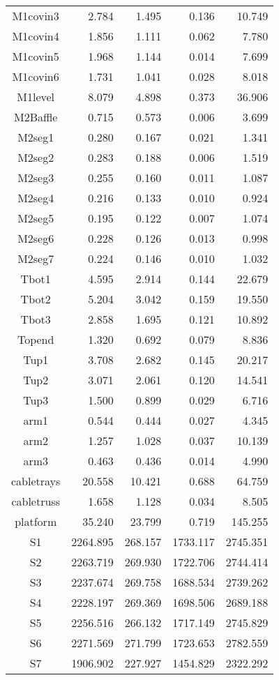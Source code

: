 \begin{longtable}{crrrr}
 M1covin3 & 2.784 & 1.495 & 0.136 & 10.749 \\
 M1covin4 & 1.856 & 1.111 & 0.062 & 7.780 \\
 M1covin5 & 1.968 & 1.144 & 0.014 & 7.699 \\
 M1covin6 & 1.731 & 1.041 & 0.028 & 8.018 \\
 M1level & 8.079 & 4.898 & 0.373 & 36.906 \\
 M2Baffle & 0.715 & 0.573 & 0.006 & 3.699 \\
 M2seg1 & 0.280 & 0.167 & 0.021 & 1.341 \\
 M2seg2 & 0.283 & 0.188 & 0.006 & 1.519 \\
 M2seg3 & 0.255 & 0.160 & 0.011 & 1.087 \\
 M2seg4 & 0.216 & 0.133 & 0.010 & 0.924 \\
 M2seg5 & 0.195 & 0.122 & 0.007 & 1.074 \\
 M2seg6 & 0.228 & 0.126 & 0.013 & 0.998 \\
 M2seg7 & 0.224 & 0.146 & 0.010 & 1.032 \\
 Tbot1 & 4.595 & 2.914 & 0.144 & 22.679 \\
 Tbot2 & 5.204 & 3.042 & 0.159 & 19.550 \\
 Tbot3 & 2.858 & 1.695 & 0.121 & 10.892 \\
 Topend & 1.320 & 0.692 & 0.079 & 8.836 \\
 Tup1 & 3.708 & 2.682 & 0.145 & 20.217 \\
 Tup2 & 3.071 & 2.061 & 0.120 & 14.541 \\
 Tup3 & 1.500 & 0.899 & 0.029 & 6.716 \\
 arm1 & 0.544 & 0.444 & 0.027 & 4.345 \\
 arm2 & 1.257 & 1.028 & 0.037 & 10.139 \\
 arm3 & 0.463 & 0.436 & 0.014 & 4.990 \\
 cabletrays & 20.558 & 10.421 & 0.688 & 64.759 \\
 cabletruss & 1.658 & 1.128 & 0.034 & 8.505 \\
 platform & 35.240 & 23.799 & 0.719 & 145.255 \\
 S1 & 2264.895 & 268.157 & 1733.117 & 2745.351 \\
 S2 & 2263.719 & 269.930 & 1722.706 & 2744.414 \\
 S3 & 2237.674 & 269.758 & 1688.534 & 2739.262 \\
 S4 & 2228.197 & 269.369 & 1698.506 & 2689.188 \\
 S5 & 2256.516 & 266.132 & 1717.149 & 2745.829 \\
 S6 & 2271.569 & 271.799 & 1723.653 & 2782.559 \\
 S7 & 1906.902 & 227.927 & 1454.829 & 2322.292 \\
\bottomrule
\end{longtable}

